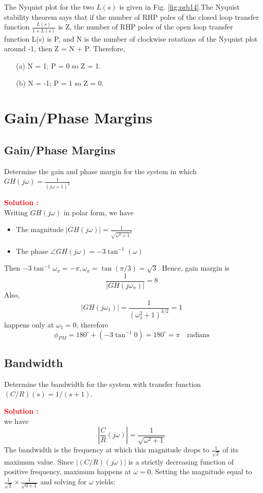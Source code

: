 \documentclass[12pt]{article}
\begin{document}
The Nyquist plot for the two $L(s)$ is given in Fig. \ref{fig:prb14}.The Nyquist stability theorem says that if the number of RHP poles of the closed loop transfer function $\frac{L(s)}{1+L(s)}$ is Z, the number of RHP poles of the open loop transfer function L(s) is P, and N is the number of clockwise rotations of the Nyquist plot around -1, then Z = N + P. Therefore,
    \begin{itemize}
        \item [(a)] N = 1; P = 0 so Z = 1.
        \item [(b)] N = -1; P = 1 so Z = 0.
    \end{itemize}
\clearpage

\section{Gain/Phase Margins}
\subsection{Gain/Phase Margins}

Determine the gain and phase margin for the system in which \(GH(j\omega) = \frac{1}{(j\omega+1)^3}\)

\textbf{\textcolor{red}{Solution :}} \\
Writing $GH(j\omega)$ in polar form, we have
\begin{itemize}
    \item The magnitude $|GH(j\omega)| = \frac{1}{\sqrt{\omega^2 + 1}^3}$
    \item The phase $\angle GH(j\omega) = -3 \tan^{-1}(\omega)$
\end{itemize}
Then \(-3 \tan^{-1} \omega_\pi = -\pi, \omega_\pi = \tan(\pi/3) = \sqrt{3}\). Hence, gain margin is
\[ \frac{1}{|GH(j\omega_\pi)|} = 8\]
Also,
\[|GH(j\omega_1)| = \frac{1}{(\omega_1^2+1)^{3/2}} = 1\]
happens only at \(\omega_1  = 0\), therefore
\[\phi_{PM} = 180^\circ + (-3\tan^{-1} 0) = 180^\circ = \pi \quad  \text{radians}\]
\clearpage

\subsection{Bandwidth}

Determine the bandwidth for the system with transfer function \((C/R)(s) = 1/(s+1)\).

\textbf{\textcolor{red}{Solution :}} \\
we have
\begin{equation}
    \left|\frac{C}{R}(j\omega)\right| = \frac{1}{\sqrt{\omega^2+1}}
\end{equation}
The bandwidth is the frequency at which this magnitude drops to \(\frac{1}{\sqrt{2}}\) of its maximum value. Since  \(|(C/R)(j\omega)|\) is a strictly decreasing function of positive frequency,  maximum happens at \(\omega = 0\). Setting the magnitude equal to \(\frac{1}{\sqrt{2}} \times \frac{1}{\sqrt{0+1}} \) and solving for \(\omega\) yields:
\end{document}
